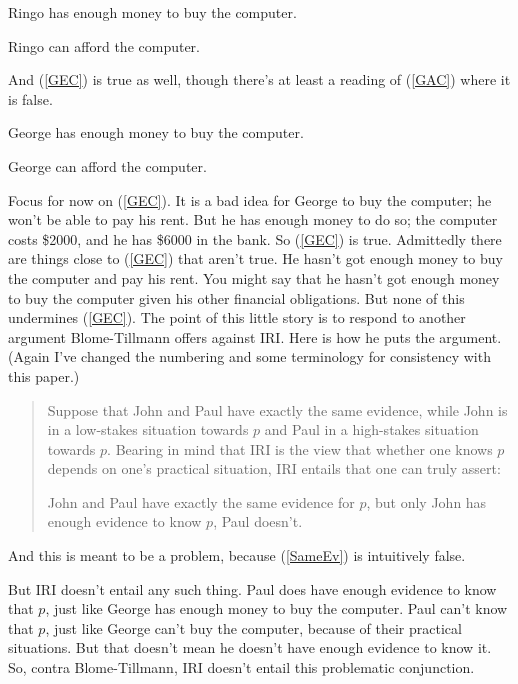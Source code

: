\documentclass[oneside]{book}
\renewcommand{\numbex}[2]{
\begin{enumerate*}
\setcounter{enumi}{\value{paper}}
\renewcommand{\labelenumi}{(\arabic{enumi})}
#2
\end{enumerate*}
\addtocounter{paper}{#1}}
\begin{document}
\numbex{2}{
\item \label{REC} Ringo has enough money to buy the computer.
\item \label{RAC} Ringo can afford the computer.}

\noindent And (\ref{GEC}) is true as well, though there's at least a reading of (\ref{GAC}) where it is false.

\numbex{2}{
\item \label{GEC} George has enough money to buy the computer.
\item \label{GAC} George can afford the computer.
}

\noindent Focus for now on (\ref{GEC}). It is a bad idea for George to buy the computer; he won't be able to pay his rent. But he has enough money to do so; the computer costs \$2000, and he has \$6000 in the bank. So (\ref{GEC}) is true. Admittedly there are things close to (\ref{GEC}) that aren't true. He hasn't got enough money to buy the computer and pay his rent. You might say that he hasn't got enough money to buy the computer given his other financial obligations. But none of this undermines (\ref{GEC}). The point of this little story is to respond to another argument Blome-Tillmann offers against IRI. Here is how he puts the argument. (Again I've changed the numbering and some terminology for consistency with this paper.)

\begin{quote}
\noindent Suppose that John and Paul have exactly the same evidence, while John is in a low-stakes situation towards $p$ and Paul in a high-stakes situation towards $p$. Bearing in mind that IRI is the view that whether one knows $p$ depends on one's practical situation, IRI entails that one can truly assert:

\numbex{1}{
\item \label{SameEv} John and Paul have exactly the same evidence for $p$, but only John has enough evidence to know $p$, Paul doesn't.} \cite[328-9]{MBT2009}
\end{quote}

\noindent And this is meant to be a problem, because (\ref{SameEv}) is intuitively false.

But IRI doesn't entail any such thing. Paul does have enough evidence to know that $p$, just like George has enough money to buy the computer. Paul can't know that $p$, just like George can't buy the computer, because of their practical situations. But that doesn't mean he doesn't have enough evidence to know it. So, contra Blome-Tillmann, IRI doesn't entail this problematic conjunction.
\end{document}
